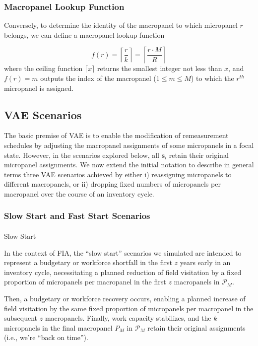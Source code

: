 \documentclass[
  number]{elsarticle}
\makeatletter
\let\oldparagraph\paragraph
\renewcommand{\paragraph}{
    \@ifstar
      \xxxParagraphStar
      \xxxParagraphNoStar
  }
\newcommand{\xxxParagraphStar}[1]{\oldparagraph*{#1}\mbox{}}
\newcommand{\xxxParagraphNoStar}[1]{\oldparagraph{#1}\mbox{}}
\makeatother
\begin{document}
\subsubsection{Macropanel Lookup
Function}\label{macropanel-lookup-function}

Conversely, to determine the identity of the macropanel to which
micropanel \(r\) belongs, we can define a macropanel lookup function

\[f(r) = \left\lceil \frac{r}{k} \right\rceil = \left\lceil \frac{r \cdot M}{R} \right\rceil\]
where the ceiling function \(\lceil x \rceil\) returns the smallest
integer not less than \(x\), and \(f(r) = m\) outputs the index of the
macropanel (\(1 \leq m \leq M\)) to which the \(r^{th}\) micropanel is
assigned.

\subsection{VAE Scenarios}\label{vae-scenarios}

The basic premise of VAE is to enable the modification of remeasurement
schedules by adjusting the macropanel assignments of some micropanels in
a focal state. However, in the scenarios explored below, all
\(\mathbf{s}_i\) retain their original micropanel assignments. We now
extend the initial notation to describe in general terms three VAE
scenarios achieved by either i) reassigning micropanels to different
macropanels, or ii) dropping fixed numbers of micropanels per macropanel
over the course of an inventory cycle.

\subsubsection{Slow Start and Fast Start
Scenarios}\label{slow-start-and-fast-start-scenarios}

\paragraph{Slow Start}\label{slow-start}

In the context of FIA, the ``slow start'' scenarios we simulated are
intended to represent a budgetary or workforce shortfall in the first
\(z\) years early in an inventory cycle, necessitating a planned
reduction of field visitation by a fixed proportion of micropanels per
macropanel in the first \(z\) macropanels in \(\mathcal{P}_M\).

Then, a budgetary or workforce recovery occurs, enabling a planned
increase of field visitation by the same fixed proportion of micropanels
per macropanel in the subsequent \(z\) macropanels. Finally, work
capacity stabilizes, and the \(k\) micropanels in the final macropanel
\(P_M\) in \(\mathcal{P}_M\) retain their original assignments (i.e.,
we're ``back on time'').
\end{document}
